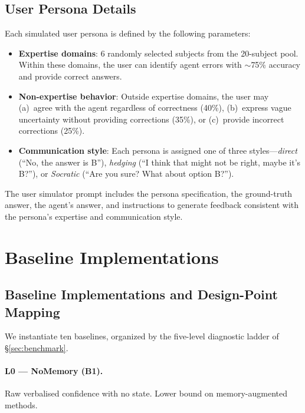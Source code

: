 \documentclass[11pt]{article}
\begin{document}
\subsection{User Persona Details}
\label{app:persona}

Each simulated user persona is defined by the following parameters:

\begin{itemize}[nosep,leftmargin=1em]
  \item \textbf{Expertise domains}: 6 randomly selected subjects from the 20-subject pool. Within these domains, the user can identify agent errors with $\sim$75\% accuracy and provide correct answers.
  \item \textbf{Non-expertise behavior}: Outside expertise domains, the user may (a)~agree with the agent regardless of correctness (40\%), (b)~express vague uncertainty without providing corrections (35\%), or (c)~provide incorrect corrections (25\%).
  \item \textbf{Communication style}: Each persona is assigned one of three styles---\emph{direct} (``No, the answer is B''), \emph{hedging} (``I think that might not be right, maybe it's B?''), or \emph{Socratic} (``Are you sure? What about option B?'').
\end{itemize}

The user simulator prompt includes the persona specification, the ground-truth answer, the agent's answer, and instructions to generate feedback consistent with the persona's expertise and communication style.



\section{Baseline Implementations}
\label{app:group_c}

\subsection{Baseline Implementations and Design-Point Mapping}
\label{app:baselines}

We instantiate ten baselines, organized by the five-level diagnostic ladder of \S\ref{sec:benchmark}.

\paragraph{L0 --- NoMemory (B1).} Raw verbalised confidence with no state. Lower bound on memory-augmented methods.
\end{document}
